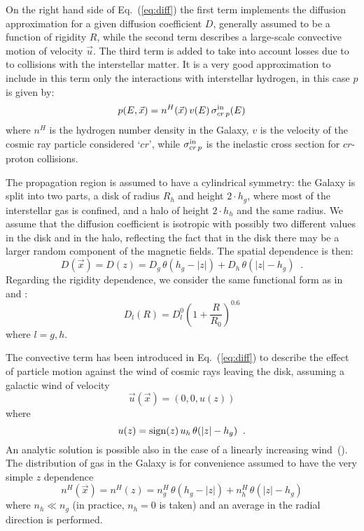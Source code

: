 On the right hand side
of Eq.~(\ref{eq:diff}) the first term implements the diffusion approximation
for a given diffusion coefficient $D$, generally assumed to be a function of
rigidity $R$, while the second term describes a large-scale convective
motion of velocity $\vec{u}$. The third term is added to take into account
losses due to to collisions with the interstellar matter.
It is a very good approximation to include in this term only the interactions
with interstellar hydrogen, in this case
$p$ is given by:
\begin{equation}
p(E,\vec{x}) = n^H(\vec{x}) \, v(E) \, \sigma^{\rm in}_{cr\,p}(E)
\end{equation}
where $n^H$ is the hydrogen number density in the Galaxy, $v$ is the
velocity of the cosmic ray particle considered `$cr$', while
$\sigma^{\rm in}_{cr\,p}$ is the inelastic cross section for $cr$-proton
collisions.


The propagation region is assumed to have a cylindrical symmetry: the
Galaxy is split into two parts, a disk of radius $R_h$ and height
$2\cdot h_g$, where most of the interstellar gas is confined, and a
halo of height $2\cdot h_h$ and the same radius. We assume that the
diffusion coefficient is isotropic with possibly two different values
in the disk and in the halo, reflecting the fact that in the disk
there may be a larger random component of the magnetic fields.
The spatial dependence is then:
\begin{equation}
D(\vec{x}) = D(z) = D_g \, \theta(h_g - |z|) + D_h \, \theta(|z| - h_g)\;\;.
\end{equation}
Regarding the rigidity dependence,
we consider the same functional form as in
\cite{Chardonnet} and \cite{bottinolast}:
\begin{equation}
D_l(R) = D_l^0 \left(1+\frac{R}{R_0}\right)^{0.6}
\label{eq:diffco}
\end{equation}
where $l=g,h$.

The convective term has been introduced in Eq.~(\ref{eq:diff}) to describe the
effect of particle motion against the wind of cosmic rays leaving the disk,
assuming a galactic wind of velocity
\begin{equation}
\vec{u}(\vec{x}) = \left(0, 0, u(z)\right)
\end{equation}
where
\begin{equation}
u(z)= {\rm sign}(z) \, u_h \, \theta(|z| - h_g)\;\;.
\end{equation}
An analytic solution is possible also in the case of a linearly increasing
wind~(\cite{pieroclumpy}).
The distribution of gas in the Galaxy is for convenience assumed
to have the very simple $z$ dependence
\begin{equation}
n^H(\vec{x}) = n^H(z)
= n_g^H \, \theta(h_g - |z|) + n_h^H \, \theta(|z| - h_g)
\end{equation}
where $n_h \ll n_g$ (in practice, $n_h=0$ is taken) and an average
in the radial direction is performed.

